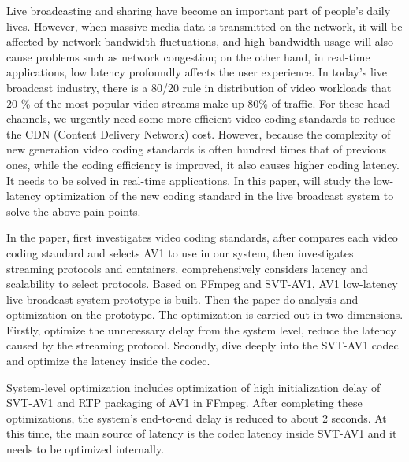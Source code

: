 \begin{enabstract}
  Live broadcasting and sharing have become an important part of people's daily lives. However, when massive media data is transmitted on the network, it will be affected by network bandwidth fluctuations, and high bandwidth usage will also cause problems such as network congestion; on the other hand, in real-time applications, low latency profoundly affects the user experience. In today's live broadcast industry, there is a 80/20 rule in distribution of video workloads that 20 \% of the most popular video streams make up 80\% of traffic. For these head channels, we urgently need some more efficient video coding standards to reduce the CDN (Content Delivery Network) cost. However, because the complexity of new generation video coding standards is often hundred times that of previous ones, while the coding efficiency is improved, it also causes higher coding latency. It needs to be solved in real-time applications. In this paper, will study the low-latency optimization of the new coding standard in the live broadcast system to solve the above pain points.

  In the paper, first investigates video coding standards, after compares each video coding standard and selects AV1 to use in our system, then investigates streaming protocols and containers, comprehensively considers latency and scalability to select protocols. Based on FFmpeg and SVT-AV1, AV1 low-latency live broadcast system prototype is built. Then the paper do analysis and optimization on the prototype. The optimization is carried out in two dimensions. Firstly, optimize the unnecessary delay from the system level, reduce the latency caused by the streaming protocol. Secondly, dive deeply into the SVT-AV1 codec and optimize the latency inside the codec.

  System-level optimization includes optimization of high initialization delay of SVT-AV1 and RTP packaging of AV1 in FFmpeg. After completing these optimizations, the system's end-to-end delay is reduced to about 2 seconds. At this time, the main source of latency is the codec latency inside SVT-AV1 and it needs to be optimized internally.


\end{enabstract}
